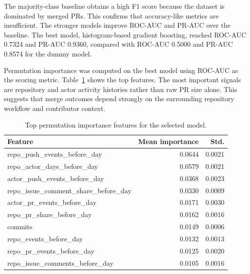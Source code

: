 The majority-class baseline obtains a high F1 score because the dataset is dominated by merged PRs. This
confirms that accuracy-like metrics are insufficient. The stronger models improve ROC-AUC and PR-AUC over the
baseline. The best model, histogram-based gradient boosting, reached ROC-AUC 0.7324 and PR-AUC 0.9360,
compared with ROC-AUC 0.5000 and PR-AUC 0.8574 for the dummy model.

Permutation importance was computed on the best model using ROC-AUC as the scoring metric.
Table~\ref{tab:permutation_importance} shows the top features. The most important signals are repository and
actor activity histories rather than raw PR size alone. This suggests that merge outcomes depend strongly on
the surrounding repository workflow and contributor context.

\begin{table}[H]
    \centering
    \small
    \caption{Top permutation importance features for the selected model.}
    \label{tab:permutation_importance}
    \begin{tabular}{lrr}
        \toprule
        Feature & Mean importance & Std. \\
        \midrule
        repo\_push\_events\_before\_day & 0.0644 & 0.0021 \\
        repo\_actor\_days\_before\_day & 0.0579 & 0.0021 \\
        actor\_push\_events\_before\_day & 0.0368 & 0.0023 \\
        repo\_issue\_comment\_share\_before\_day & 0.0330 & 0.0009 \\
        actor\_pr\_events\_before\_day & 0.0171 & 0.0030 \\
        repo\_pr\_share\_before\_day & 0.0162 & 0.0016 \\
        commits & 0.0149 & 0.0006 \\
        repo\_events\_before\_day & 0.0132 & 0.0013 \\
        repo\_pr\_events\_before\_day & 0.0125 & 0.0020 \\
        repo\_issue\_comments\_before\_day & 0.0105 & 0.0016 \\
        \bottomrule
    \end{tabular}
\end{table}

